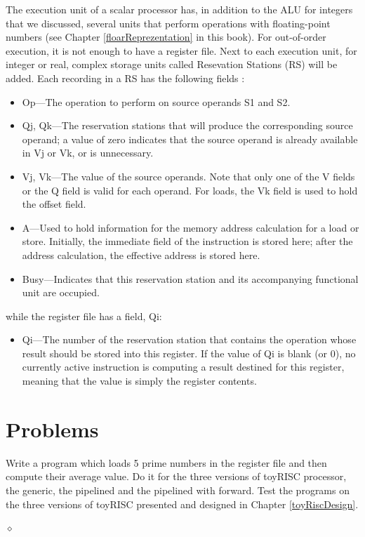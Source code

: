 The execution unit of a scalar processor has, in addition to the ALU for integers that we discussed, several units that perform operations with floating-point numbers (see Chapter \ref{floarReprezentation} in this book). For out-of-order execution, it is not enough to have a register file. Next to each execution unit, for integer or real, complex storage units called Resevation Stations (RS) will be added. Each recording in a RS has the following fields \citep{Patterson19}:
\begin{itemize}
    \item Op—The operation to perform on source operands S1 and S2.
\item Qj, Qk—The reservation stations that will produce the corresponding source
operand; a value of zero indicates that the source operand is already available
in Vj or Vk, or is unnecessary.
\item Vj, Vk—The value of the source operands. Note that only one of the V fields or
the Q field is valid for each operand. For loads, the Vk field is used to hold the
offset field.
\item A—Used to hold information for the memory address calculation for a load or
store. Initially, the immediate field of the instruction is stored here; after the
address calculation, the effective address is stored here.
\item Busy—Indicates that this reservation station and its accompanying functional
unit are occupied.
\end{itemize}
while the register file has a field, Qi:
\begin{itemize}
    \item Qi—The number of the reservation station that contains the operation whose
result should be stored into this register. If the value of Qi is blank (or 0), no currently active instruction is computing a result destined for this register, meaning that the value is simply the register contents.
\end{itemize}

\section{Problems}

\begin{problem}
Write a program which loads 5  prime numbers in the register file and then compute their average value. Do it for the three versions of toyRISC processor, the generic, the pipelined and the pipelined with forward. Test the programs on the three  versions of toyRISC presented and designed in Chapter \ref{toyRiscDesign}.

$\diamond$
\end{problem}

